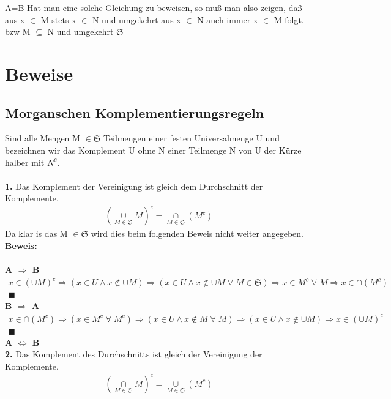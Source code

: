 \documentclass[../AbiMappe_Mathe.tex]{subfiles}
\begin{document}
A=B
Hat man eine solche Gleichung zu beweisen, so muß man also zeigen, daß aus x $\in$ M stets x $\in$ N und umgekehrt aus x $\in$ N auch immer x $\in$ M folgt. bzw M $\subseteq$ N und umgekehrt
 $\mathfrak{S}$

 \section{Beweise}
 \subsection{Morganschen Komplementierungsregeln}
 Sind alle Mengen M $\in \mathfrak{S}$ Teilmengen einer festen Universalmenge U und bezeichnen wir das Komplement U ohne N einer Teilmenge N von U der Kürze halber mit $N^c$.\\\\
 \textbf{1. }Das Komplement der Vereinigung ist gleich dem Durchschnitt der Komplemente.\\
 \begin{align*}
	(\underset{M \in \mathfrak{S}}{\overset{}{\cup}}M)^c =  \underset{M \in \mathfrak{S}}{\overset{}{\cap}}(M^c)
 \end{align*}
 Da klar is das M $\in \mathfrak{S}$ wird dies beim folgenden Beweis nicht weiter angegeben.\\
\textbf{Beweis:}\\\\
\textbf{A $\Rightarrow$ B }
\begin{align*}
	x \in (\cup M)^c \Rightarrow (x \in U \land x \notin \cup M ) \Rightarrow (x \in U \land x \notin \cup M \; \forall \; M \in \mathfrak{S}) \Rightarrow x\in M^c\;\forall\; M \Rightarrow x \in \cap(M^c)\\
	\blacksquare
 \end{align*}
 \textbf{B $\Rightarrow$ A }\\
 \begin{align*}
 x \in \cap (M^c) \Rightarrow (x \in M^c\;\forall\;M^c) \Rightarrow (x \in U \land x \notin M\; \forall\; M) \Rightarrow (x \in U \land x \notin \cup M) \Rightarrow x \in (\cup M)^c\\
 \blacksquare
 \end{align*}
 \textbf{A $\Leftrightarrow$ B}
 \\\textbf{2. }Das Komplement des Durchschnitts ist gleich der Vereinigung der Komplemente.\\
 \begin{align*}
	(\underset{M \in \mathfrak{S}}{\overset{}{\cap}}M)^c =  \underset{M \in \mathfrak{S}}{\overset{}{\cup}}(M^c)
 \end{align*}
\end{document}
